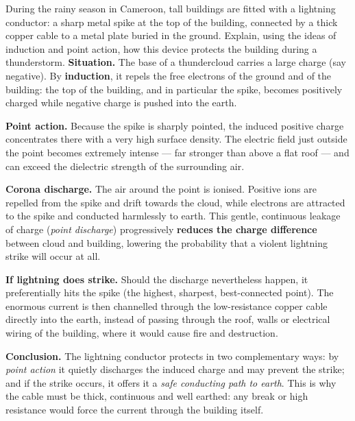 \documentclass[11pt]{article}
\begin{document}
\begin{exoresolu}
During the rainy season in Cameroon, tall buildings are fitted with a lightning conductor: a sharp metal spike at the top of the building, connected by a thick copper cable to a metal plate buried in the ground. Explain, using the ideas of induction and point action, how this device protects the building during a thunderstorm.
\tcblower
\textbf{Situation.} The base of a thundercloud carries a large charge (say negative). By \textbf{induction}, it repels the free electrons of the ground and of the building: the top of the building, and in particular the spike, becomes positively charged while negative charge is pushed into the earth.

\textbf{Point action.} Because the spike is sharply pointed, the induced positive charge concentrates there with a very high surface density. The electric field just outside the point becomes extremely intense --- far stronger than above a flat roof --- and can exceed the dielectric strength of the surrounding air.

\textbf{Corona discharge.} The air around the point is ionised. Positive ions are repelled from the spike and drift towards the cloud, while electrons are attracted to the spike and conducted harmlessly to earth. This gentle, continuous leakage of charge (\emph{point discharge}) progressively \textbf{reduces the charge difference} between cloud and building, lowering the probability that a violent lightning strike will occur at all.

\textbf{If lightning does strike.} Should the discharge nevertheless happen, it preferentially hits the spike (the highest, sharpest, best-connected point). The enormous current is then channelled through the low-resistance copper cable directly into the earth, instead of passing through the roof, walls or electrical wiring of the building, where it would cause fire and destruction.

\textbf{Conclusion.} The lightning conductor protects in two complementary ways: by \emph{point action} it quietly discharges the induced charge and may prevent the strike; and if the strike occurs, it offers it a \emph{safe conducting path to earth}. This is why the cable must be thick, continuous and well earthed: any break or high resistance would force the current through the building itself.
\end{exoresolu}
\end{document}
